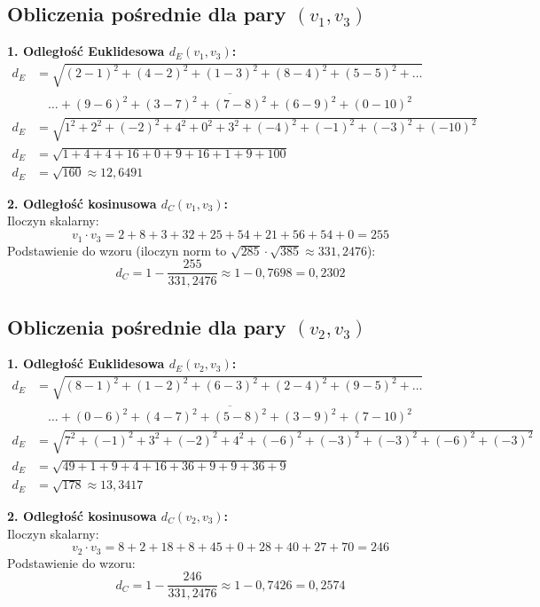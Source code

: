 \documentclass[12pt,a4paper]{article}
\begin{document}
\subsection{Obliczenia pośrednie dla pary $(v_1, v_3)$}

\textbf{1. Odległość Euklidesowa $d_E(v_1, v_3)$:}
\begin{align*}
d_E &= \sqrt{(2-1)^2 + (4-2)^2 + (1-3)^2 + (8-4)^2 + (5-5)^2 + \dots} \\
&\quad \overline{\dots + (9-6)^2 + (3-7)^2 + (7-8)^2 + (6-9)^2 + (0-10)^2} \\
d_E &= \sqrt{1^2 + 2^2 + (-2)^2 + 4^2 + 0^2 + 3^2 + (-4)^2 + (-1)^2 + (-3)^2 + (-10)^2} \\
d_E &= \sqrt{1 + 4 + 4 + 16 + 0 + 9 + 16 + 1 + 9 + 100} \\
d_E &= \sqrt{160} \approx 12,6491
\end{align*}

\textbf{2. Odległość kosinusowa $d_C(v_1, v_3)$:} \\
Iloczyn skalarny:
\begin{equation}
v_1 \cdot v_3 = 2 + 8 + 3 + 32 + 25 + 54 + 21 + 56 + 54 + 0 = 255
\end{equation}
Podstawienie do wzoru (iloczyn norm to $\sqrt{285} \cdot \sqrt{385} \approx 331,2476$):
\begin{equation}
d_C = 1 - \frac{255}{331,2476} \approx 1 - 0,7698 = 0,2302
\end{equation}

\subsection{Obliczenia pośrednie dla pary $(v_2, v_3)$}

\textbf{1. Odległość Euklidesowa $d_E(v_2, v_3)$:}
\begin{align*}
d_E &= \sqrt{(8-1)^2 + (1-2)^2 + (6-3)^2 + (2-4)^2 + (9-5)^2 + \dots} \\
&\quad \overline{\dots + (0-6)^2 + (4-7)^2 + (5-8)^2 + (3-9)^2 + (7-10)^2} \\
d_E &= \sqrt{7^2 + (-1)^2 + 3^2 + (-2)^2 + 4^2 + (-6)^2 + (-3)^2 + (-3)^2 + (-6)^2 + (-3)^2} \\
d_E &= \sqrt{49 + 1 + 9 + 4 + 16 + 36 + 9 + 9 + 36 + 9} \\
d_E &= \sqrt{178} \approx 13,3417
\end{align*}

\textbf{2. Odległość kosinusowa $d_C(v_2, v_3)$:} \\
Iloczyn skalarny:
\begin{equation}
v_2 \cdot v_3 = 8 + 2 + 18 + 8 + 45 + 0 + 28 + 40 + 27 + 70 = 246
\end{equation}
Podstawienie do wzoru:
\begin{equation}
d_C = 1 - \frac{246}{331,2476} \approx 1 - 0,7426 = 0,2574
\end{equation}
\end{document}
